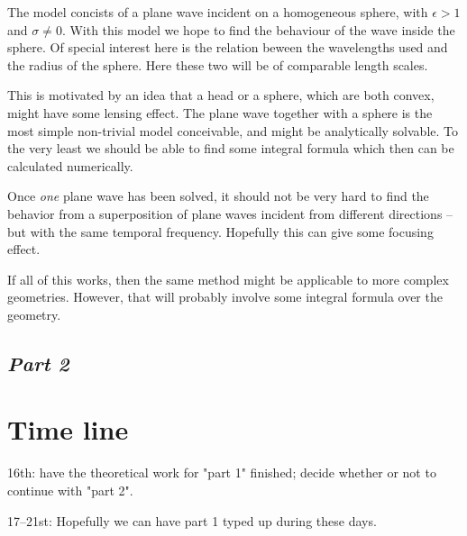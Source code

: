\documentclass[11pt,a4paper, 
english, swedish %
]{article}
\begin{document}
The model concists of a plane wave incident on a homogeneous sphere, with $\epsilon>1$ and $\sigma\neq0$. With this model we hope to find the behaviour of the wave inside the sphere. Of special interest here is the relation beween the wavelengths used and the radius of the sphere. Here these two will be of comparable length scales. 

This is motivated by an idea that a head or a sphere, which are both convex, might have some lensing effect. The plane wave together with a sphere is the most simple non-trivial model conceivable, and might be analytically solvable. To the very least we should be able to find some integral formula which then can be calculated numerically.

Once \emph{one} plane wave has been solved, it should not be very hard to find the behavior from a superposition of plane waves incident from different directions -- but with the same temporal frequency. Hopefully this can give some focusing effect. 

If all of this works, then the same method might be applicable to more complex geometries. However, that will probably involve some integral formula over the geometry.



\subsection{\textit{Part 2}}





\section{Time line}


16th: have the theoretical work for "part 1" finished; decide whether or not to continue with "part 2".

17--21st: Hopefully we can have part 1 typed up during these days.











%

\end{document}

